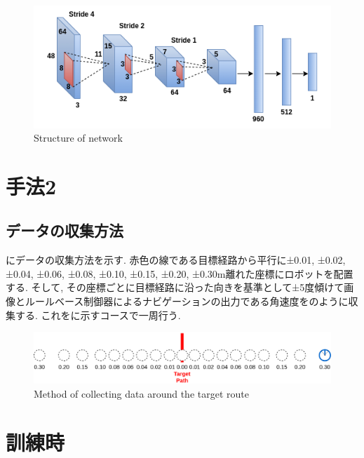 \begin{figure}[h]
  \centering
  \includegraphics[keepaspectratio, scale=0.5]{images/cnn.png}
  \caption{Structure of network}
  \label{Fig:cnn}
  \end{figure}

\newpage
\section{手法2}

\subsection{データの収集方法}
にデータの収集方法を示す. 赤色の線である目標経路から平行に±0.01, ±0.02, ±0.04, ±0.06, ±0.08, ±0.10, ±0.15, ±0.20, ±0.30m離れた座標にロボットを配置する. そして, その座標ごとに目標経路に沿った向きを基準として±5度傾けて画像とルールベース制御器によるナビゲーションの出力である角速度をのように収集する. これをに示すコースで一周行う. 

\vspace{10mm}

\begin{figure}[h]
  \centering
  \includegraphics[keepaspectratio, scale=0.18]{images/collect-data.png}
  \caption{Method of collecting data around the target route}
  \label{Fig:collect-data}
  \end{figure}

\newpage
\section{訓練時}